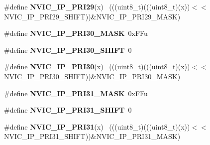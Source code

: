 \begin{DoxyCompactItemize}
\item 
\hypertarget{group___n_v_i_c___register___masks_ga86df480f5e860ad5791161fccc202cd5}{}\#define {\bfseries N\+V\+I\+C\+\_\+\+I\+P\+\_\+\+P\+R\+I29}(x)                                              ~(((uint8\+\_\+t)(((uint8\+\_\+t)(x))$<$$<$N\+V\+I\+C\+\_\+\+I\+P\+\_\+\+P\+R\+I29\+\_\+\+S\+H\+I\+F\+T))\&N\+V\+I\+C\+\_\+\+I\+P\+\_\+\+P\+R\+I29\+\_\+\+M\+A\+S\+K)\label{group___n_v_i_c___register___masks_ga86df480f5e860ad5791161fccc202cd5}

\item 
\hypertarget{group___n_v_i_c___register___masks_gacaaafd939b4c24ac8103480884d4832f}{}\#define {\bfseries N\+V\+I\+C\+\_\+\+I\+P\+\_\+\+P\+R\+I30\+\_\+\+M\+A\+S\+K}~0x\+F\+Fu\label{group___n_v_i_c___register___masks_gacaaafd939b4c24ac8103480884d4832f}

\item 
\hypertarget{group___n_v_i_c___register___masks_ga22f64890b01fc2a8a0b9262e3ad73a1f}{}\#define {\bfseries N\+V\+I\+C\+\_\+\+I\+P\+\_\+\+P\+R\+I30\+\_\+\+S\+H\+I\+F\+T}~0\label{group___n_v_i_c___register___masks_ga22f64890b01fc2a8a0b9262e3ad73a1f}

\item 
\hypertarget{group___n_v_i_c___register___masks_ga72da71aff40dac249219e20a295efa31}{}\#define {\bfseries N\+V\+I\+C\+\_\+\+I\+P\+\_\+\+P\+R\+I30}(x)                                              ~(((uint8\+\_\+t)(((uint8\+\_\+t)(x))$<$$<$N\+V\+I\+C\+\_\+\+I\+P\+\_\+\+P\+R\+I30\+\_\+\+S\+H\+I\+F\+T))\&N\+V\+I\+C\+\_\+\+I\+P\+\_\+\+P\+R\+I30\+\_\+\+M\+A\+S\+K)\label{group___n_v_i_c___register___masks_ga72da71aff40dac249219e20a295efa31}

\item 
\hypertarget{group___n_v_i_c___register___masks_ga5641ade953b4340b6dfb3e232a83edab}{}\#define {\bfseries N\+V\+I\+C\+\_\+\+I\+P\+\_\+\+P\+R\+I31\+\_\+\+M\+A\+S\+K}~0x\+F\+Fu\label{group___n_v_i_c___register___masks_ga5641ade953b4340b6dfb3e232a83edab}

\item 
\hypertarget{group___n_v_i_c___register___masks_gaa2551187c8cb06e66343245d645c4934}{}\#define {\bfseries N\+V\+I\+C\+\_\+\+I\+P\+\_\+\+P\+R\+I31\+\_\+\+S\+H\+I\+F\+T}~0\label{group___n_v_i_c___register___masks_gaa2551187c8cb06e66343245d645c4934}

\item 
\hypertarget{group___n_v_i_c___register___masks_ga92f54d9330341ccdc609191487fa2344}{}\#define {\bfseries N\+V\+I\+C\+\_\+\+I\+P\+\_\+\+P\+R\+I31}(x)                                              ~(((uint8\+\_\+t)(((uint8\+\_\+t)(x))$<$$<$N\+V\+I\+C\+\_\+\+I\+P\+\_\+\+P\+R\+I31\+\_\+\+S\+H\+I\+F\+T))\&N\+V\+I\+C\+\_\+\+I\+P\+\_\+\+P\+R\+I31\+\_\+\+M\+A\+S\+K)\label{group___n_v_i_c___register___masks_ga92f54d9330341ccdc609191487fa2344}


\end{DoxyCompactItemize}

